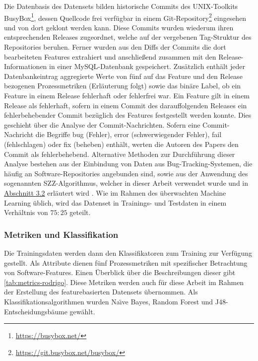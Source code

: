 Die Datenbasis des Datensets bilden historische Commits des UNIX-Toolkits BusyBox\footnote{\url{https://busybox.net/}}, dessen Quellcode frei verfügbar in einem Git-Repository\footnote{\url{https://git.busybox.net/busybox/}} eingesehen und von dort geklont werden kann. Diese Commits wurden wiederum ihren entsprechenden Releases zugeordnet, welche auf der vergebenen Tag-Struktur des Repositories beruhen. Ferner wurden aus den Diffs der Commits die dort bearbeiteten Features extrahiert und anschließend zusammen mit den Release-Informationen in einer MySQL-Datenbank gespeichert. Zusätzlich enthält jeder Datenbankeintrag aggregierte Werte von fünf auf das Feature und den Release bezogenen Prozessmetriken (Erläuterung folgt) sowie das binäre Label, ob ein Feature in einem Release fehlerhaft oder fehlerfrei war. Ein Feature gilt in einem Release als fehlerhaft, sofern in einem Commit des darauffolgenden Releases ein fehlerbehebender Commit bezüglich des Features festgestellt werden konnte. Dies geschieht über die Analyse der Commit-Nachrichten. Sofern eine Commit-Nachricht die Begriffe \glqq bug\grqq{} (Fehler), \glqq error\grqq{} (schwerwiegender Fehler), \glqq fail\grqq{} (fehlschlagen) oder \glqq fix\grqq{} (beheben) enthält, werten die Autoren des Papers den Commit als fehlerbehebend. Alternative Methoden zur Durchführung dieser Analyse bestehen aus der Einbindung von Daten aus Bug-Tracking-Systemen, die häufig an Software-Repositories angebunden sind, sowie aus der Anwendung des sogenannten SZZ-Algorithmus, welcher in dieser Arbeit verwendet wurde und in \hyperref[szz-def]{Abschnitt 3.2} erläutert wird \cite{Sliwerski2005,Zimmermann2007}. Wie im Rahmen des überwachten Machine Learning üblich, wird das Datenset in Trainings- und Testdaten in einem Verhältnis von $75:25$ geteilt. 

\subsubsection*{Metriken und Klassifikation}

Die Trainingsdaten werden dann den Klassifikatoren zum Training zur Verfügung gestellt. Als Attribute dienen fünf Prozessmetriken mit spezifischer Betrachtung von Software-Features. Einen Überblick über die Beschreibungen dieser gibt \autoref{tab:metrics-rodrigo}. Diese Metriken werden auch für diese Arbeit im Rahmen der Erstellung des featurebasierten Datensets übernommen. Als Klassifikationsalgorithmen wurden Na\"{\i}ve Bayes, Random Forest und J48-Entscheidungsbäume gewählt.

